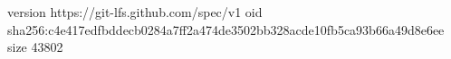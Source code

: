 version https://git-lfs.github.com/spec/v1
oid sha256:c4e417edfbddecb0284a7ff2a474de3502bb328acde10fb5ca93b66a49d8e6ee
size 43802
